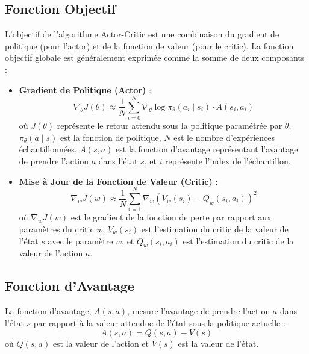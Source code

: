 \documentclass[a4paper, 12pt]{article}
\begin{document}
\subsection{Fonction Objectif}
L'objectif de l'algorithme Actor-Critic est une combinaison du gradient de politique (pour l'actor) et de la fonction de valeur (pour le critic). La fonction objectif globale est généralement exprimée comme la somme de deux composants :
\begin{itemize}
    \item \textbf{Gradient de Politique (Actor)} :
    \[
    \nabla_\theta J(\theta) \approx \frac{1}{N} \sum_{i=0}^{N} \nabla_\theta \log \pi_\theta(a_i \mid s_i) \cdot A(s_i, a_i)
    \]
    où $J(\theta)$ représente le retour attendu sous la politique paramétrée par $\theta$, $\pi_\theta(a \mid s)$ est la fonction de politique, $N$ est le nombre d'expériences échantillonnées, $A(s, a)$ est la fonction d'avantage représentant l'avantage de prendre l'action $a$ dans l'état $s$, et $i$ représente l'index de l'échantillon.
    \item \textbf{Mise à Jour de la Fonction de Valeur (Critic)} :
    \[
    \nabla_w J(w) \approx \frac{1}{N} \sum_{i=1}^{N} \nabla_w (V_w(s_i) - Q_w(s_i, a_i))^2
    \]
    où $\nabla_w J(w)$ est le gradient de la fonction de perte par rapport aux paramètres du critic $w$, $V_w(s_i)$ est l'estimation du critic de la valeur de l'état $s$ avec le paramètre $w$, et $Q_w(s_i, a_i)$ est l'estimation du critic de la valeur de l'action $a$.
\end{itemize}

\subsection{Fonction d'Avantage}
La fonction d'avantage, $A(s, a)$, mesure l'avantage de prendre l'action $a$ dans l'état $s$ par rapport à la valeur attendue de l'état sous la politique actuelle :
\[
A(s, a) = Q(s, a) - V(s)
\]
où $Q(s, a)$ est la valeur de l'action et $V(s)$ est la valeur de l'état.
\end{document}
